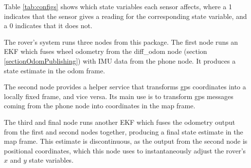 Table \ref{tab:configs} shows which state variables each sensor affects, where a 1 indicates that the sensor gives a reading for the corresponding state variable, and a 0 indicates that it does not.

The rover's system runs three nodes from this package. The first node runs an EKF which fuses wheel odometry from the diff\_odom node (section \ref{sectionOdomPublishing}) with IMU data from the phone node. It produces a state estimate in the odom frame.

The second node provides a helper service that transforms gps coordinates into a locally fixed frame, and vice versa. Its main use is to transform gps messages coming from the phone node into coordinates in the map frame.

The third and final node runs another EKF which fuses the odometry output from the first and second nodes together, producing a final  state estimate in the map frame. This estimate is discontinuous, as the output from the second node is positional coordinates, which this node uses to instantaneously adjust the rover's \(x\) and \(y\) state variables.